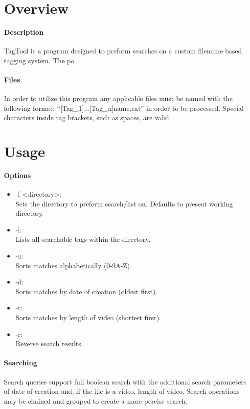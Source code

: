 \documentclass[12pt]{article}
\begin{document}
\maketitle
\section{Overview}
\paragraph{Description}
TagTool is a program designed to preform searches on a custom filename based tagging system. The po
\paragraph{Files}
In order to utilize this program any applicable files must be named with the following format: ``[Tag\_1]...[Tag\_n]name.ext'' in order to be processed. Special characters inside tag brackets, such as spaces, are valid.
\section{Usage}\label{usage}
\paragraph{Options}
\begin{itemize}
    \item -f <directory>:\\ Sets the directory to preform search/list on. Defaults to present working directory.
    \item -l:\\ Lists all searchable tags within the directory.
    \item -n:\\ Sorts matches alphabetically (0-9A-Z).
    \item -d:\\ Sorts matches by date of creation (oldest first).
    \item -t:\\ Sorts matches by length of video (shortest first).
    \item -r:\\ Reverse search results.
\end{itemize}
\paragraph{Searching}\label{searching} Search queries support full boolean search with the additional search parameters of date of creation and, if the file is a video, length of video. Search operations may be chained and grouped to create a more percise search.
\end{document}
